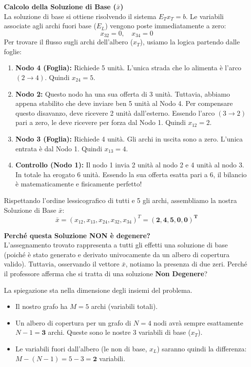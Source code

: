 \documentclass[12pt, a4paper]{article}
\begin{document}
	\vspace{0.4cm}
	\textbf{Calcolo della Soluzione di Base ($\bar{x}$)}\\
	La soluzione di base si ottiene risolvendo il sistema $E_T x_T = b$. Le variabili associate agli archi fuori base ($E_L$) vengono poste immediatamente a zero:
	\[ x_{32} = 0, \quad x_{34} = 0 \]
	Per trovare il flusso sugli archi dell'albero ($x_T$), usiamo la logica partendo dalle foglie:
	\begin{enumerate}
		\item \textbf{Nodo 4 (Foglia):} Richiede 5 unità. L'unica strada che lo alimenta è l'arco $(2\to4)$. Quindi $x_{24} = 5$.
		\item \textbf{Nodo 2:} Questo nodo ha una sua offerta di 3 unità. Tuttavia, abbiamo appena stabilito che deve inviare ben 5 unità al Nodo 4. Per compensare questo disavanzo, deve ricevere 2 unità dall'esterno. Essendo l'arco $(3\to2)$ pari a zero, le deve ricevere per forza dal Nodo 1. Quindi $x_{12} = 2$.
		\item \textbf{Nodo 3 (Foglia):} Richiede 4 unità. Gli archi in uscita sono a zero. L'unica entrata è dal Nodo 1. Quindi $x_{13} = 4$.
		\item \textbf{Controllo (Nodo 1):} Il nodo 1 invia 2 unità al nodo 2 e 4 unità al nodo 3. In totale ha erogato 6 unità. Essendo la sua offerta esatta pari a 6, il bilancio è matematicamente e fisicamente perfetto!
	\end{enumerate}
	
	Rispettando l'ordine lessicografico di tutti e 5 gli archi, assembliamo la nostra Soluzione di Base $\bar{x}$:
	\[ \bar{x} = (x_{12}, x_{13}, x_{24}, x_{32}, x_{34})^T = \mathbf{(2, 4, 5, 0, 0)^T} \]
	
	\vspace{0.4cm}
	\textbf{Perché questa Soluzione NON è degenere?}\\
	L'assegnamento trovato rappresenta a tutti gli effetti una soluzione di base (poiché è stato generato e derivato univocamente da un albero di copertura valido). Tuttavia, osservando il vettore $\bar{x}$, notiamo la presenza di due zeri. Perché il professore afferma che si tratta di una soluzione \textbf{Non Degenere}?
	
	La spiegazione sta nella dimensione degli insiemi del problema.
	\begin{itemize}[label=\textcolor{titlecolor}{\Large\textbullet}, itemsep=2pt, leftmargin=1.5cm]
		\item Il nostro grafo ha $M = 5$ archi (variabili totali).
		\item Un albero di copertura per un grafo di $N = 4$ nodi avrà sempre esattamente $N-1 = \mathbf{3}$ archi. Queste sono le nostre 3 variabili di base ($x_T$).
		\item Le variabili fuori dall'albero (le non di base, $x_L$) saranno quindi la differenza: $M - (N-1) = 5 - 3 = \mathbf{2}$ variabili.
	\end{itemize}
	
\end{document}
